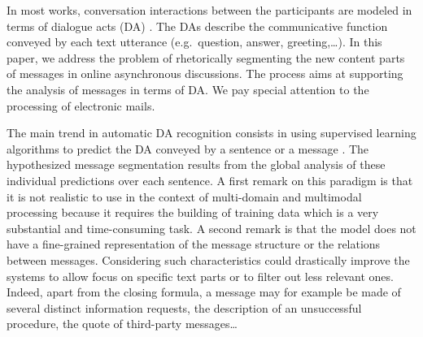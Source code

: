 In most works, conversation interactions between the participants are modeled in terms of dialogue acts (DA) \cite{austin:1970}. The DAs describe the communicative function conveyed by each text utterance  (e.g.~question, answer, greeting,\ldots).
%
In this paper, we address the problem of rhetorically segmenting the new content parts of messages in online asynchronous discussions. 
The process aims at supporting the analysis of messages in terms of DA.
We pay special attention to the processing of electronic mails.

%
The main trend in automatic DA recognition consists in using supervised learning algorithms to predict the DA conveyed by a sentence or a message \cite{joty:2013:sigdial}.
%
The hypothesized message segmentation results from the global analysis of these individual predictions over each sentence.
%
A first remark on this paradigm is that it is not realistic to use in the context of multi-domain and multimodal processing because it requires the building of training data which is a very substantial and time-consuming task.
%
A second remark is that the model does not have a fine-grained representation of the message structure or the relations between messages. Considering such characteristics could drastically improve the systems %
to allow focus on specific text parts or to filter out less relevant ones. %
Indeed, apart from the closing formula, a message may for example be made of several distinct information requests, the description of an unsuccessful procedure, the quote of third-party messages\ldots

